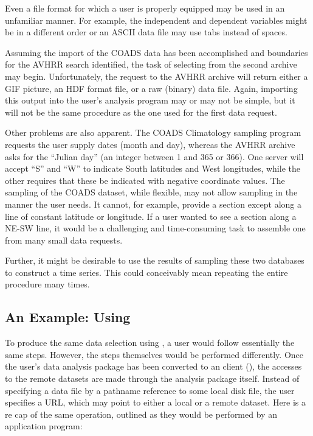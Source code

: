 Even a file format for which a user is properly equipped may be used
in an unfamiliar manner. For example, the independent and dependent
variables might be in a different order or an ASCII data file may use
tabs instead of spaces.

Assuming the import of the COADS data has been accomplished and
boundaries for the AVHRR search identified, the task of selecting from
the second archive may begin. Unfortunately, the request to the AVHRR
archive will return either a GIF picture, an HDF format file, or a raw
(binary) data file. Again, importing this output into the user's
analysis program may or may not be simple, but it will not be the same
procedure as the one used for the first data request.

Other problems are also apparent. The COADS Climatology sampling
program requests the user supply dates (month and day), whereas the
AVHRR archive asks for the ``Julian day'' (an integer between 1 and
365 or 366). One server will accept ``S'' and ``W'' to indicate South
latitudes and West longitudes, while the other requires that these be
indicated with negative coordinate values. The sampling of the COADS
dataset, while flexible, may not allow sampling in the manner the user
needs. It cannot, for example, provide a section except along a line
of constant latitude or longitude. If a user wanted to see a section
along a NE-SW line, it would be a challenging and time-consuming
task to assemble one from many small data requests.

Further, it might be desirable to use the results of sampling these
two databases to construct a time series. This could conceivably mean
repeating the entire procedure many times.

\subsection{An Example: Using \opendap}
\label{intro,opd-example}

To produce the same data selection using \opendap, a user would follow
essentially the same steps. However, the steps themselves would be
performed differently. Once the user's data analysis package has been
converted to an \opendap client
(), the  
accesses to the remote datasets are made through the analysis package
itself. Instead of specifying a data file by a pathname reference to
some local disk file, the user specifies a URL, which may point to
either a local or a remote dataset.  Here is a re cap of the same operation,
outlined as they would be performed by an \opendap application program:

